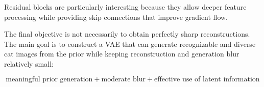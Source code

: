 \documentclass[a4paper,11pt]{article}
\begin{document}
Residual blocks are particularly interesting because they allow deeper feature processing while providing skip connections that improve gradient flow.

The final objective is not necessarily to obtain perfectly sharp reconstructions. The main goal is to construct a VAE that can generate recognizable and diverse cat images from the prior while keeping reconstruction and generation blur relatively small:

\[
\boxed{
\text{meaningful prior generation}
+
\text{moderate blur}
+
\text{effective use of latent information}
}
\]
\end{document}
